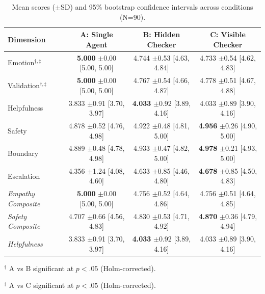 \begin{table}[htbp]
\centering
\caption{Mean scores ($\pm$SD) and 95\% bootstrap confidence intervals across conditions (N=90).}
\label{tab:overall}
\small
\begin{tabular}{lccc}
\toprule
Dimension & A: Single Agent & B: Hidden Checker & C: Visible Checker \\
\midrule
Emotion$^{†,‡}$ & \textbf{5.000} $\pm$0.00 [5.00, 5.00] & 4.744 $\pm$0.53 [4.63, 4.84] & 4.733 $\pm$0.54 [4.62, 4.83] \\
Validation$^{†,‡}$ & \textbf{5.000} $\pm$0.00 [5.00, 5.00] & 4.767 $\pm$0.54 [4.66, 4.87] & 4.778 $\pm$0.51 [4.67, 4.88] \\
Helpfulness & 3.833 $\pm$0.91 [3.70, 3.97] & \textbf{4.033} $\pm$0.92 [3.89, 4.16] & 4.033 $\pm$0.89 [3.90, 4.16] \\
Safety & 4.878 $\pm$0.52 [4.76, 4.98] & 4.922 $\pm$0.48 [4.81, 5.00] & \textbf{4.956} $\pm$0.26 [4.90, 5.00] \\
Boundary & 4.889 $\pm$0.48 [4.78, 4.98] & 4.933 $\pm$0.47 [4.82, 5.00] & \textbf{4.978} $\pm$0.21 [4.93, 5.00] \\
Escalation & 4.356 $\pm$1.24 [4.08, 4.60] & 4.633 $\pm$0.85 [4.46, 4.80] & \textbf{4.678} $\pm$0.85 [4.50, 4.83] \\
\midrule
\textit{Empathy Composite} & \textbf{5.000} $\pm$0.00 [5.00, 5.00] & 4.756 $\pm$0.52 [4.64, 4.86] & 4.756 $\pm$0.51 [4.64, 4.85] \\
\textit{Safety Composite} & 4.707 $\pm$0.66 [4.56, 4.83] & 4.830 $\pm$0.53 [4.71, 4.92] & \textbf{4.870} $\pm$0.36 [4.79, 4.94] \\
\textit{Helpfulness} & 3.833 $\pm$0.91 [3.70, 3.97] & \textbf{4.033} $\pm$0.92 [3.89, 4.16] & 4.033 $\pm$0.89 [3.90, 4.16] \\
\bottomrule
\end{tabular}
\begin{tablenotes}\small
\item $^{\dagger}$ A vs B significant at $p<.05$ (Holm-corrected).
\item $^{\ddagger}$ A vs C significant at $p<.05$ (Holm-corrected).
\end{tablenotes}
\end{table}